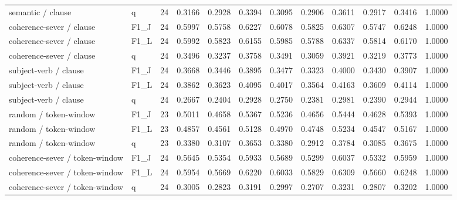\begin{table}[t]
{\begin{tabular}{llllllllllll}
semantic / clause & q & 24 & 0.3166 & 0.2928 & 0.3394 & 0.3095 & 0.2906 & 0.3611 & 0.2917 & 0.3416 & 1.0000 \\
coherence-sever / clause & F1\_J & 24 & 0.5997 & 0.5758 & 0.6227 & 0.6078 & 0.5825 & 0.6307 & 0.5747 & 0.6248 & 1.0000 \\
coherence-sever / clause & F1\_L & 24 & 0.5992 & 0.5823 & 0.6155 & 0.5985 & 0.5788 & 0.6337 & 0.5814 & 0.6170 & 1.0000 \\
coherence-sever / clause & q & 24 & 0.3496 & 0.3237 & 0.3758 & 0.3491 & 0.3059 & 0.3921 & 0.3219 & 0.3773 & 1.0000 \\
subject-verb / clause & F1\_J & 24 & 0.3668 & 0.3446 & 0.3895 & 0.3477 & 0.3323 & 0.4000 & 0.3430 & 0.3907 & 1.0000 \\
subject-verb / clause & F1\_L & 24 & 0.3862 & 0.3623 & 0.4095 & 0.4017 & 0.3564 & 0.4163 & 0.3609 & 0.4114 & 1.0000 \\
subject-verb / clause & q & 24 & 0.2667 & 0.2404 & 0.2928 & 0.2750 & 0.2381 & 0.2981 & 0.2390 & 0.2944 & 1.0000 \\
random / token-window & F1\_J & 23 & 0.5011 & 0.4658 & 0.5367 & 0.5236 & 0.4656 & 0.5444 & 0.4628 & 0.5393 & 1.0000 \\
random / token-window & F1\_L & 23 & 0.4857 & 0.4561 & 0.5128 & 0.4970 & 0.4748 & 0.5234 & 0.4547 & 0.5167 & 1.0000 \\
random / token-window & q & 23 & 0.3380 & 0.3107 & 0.3653 & 0.3380 & 0.2912 & 0.3784 & 0.3085 & 0.3675 & 1.0000 \\
coherence-sever / token-window & F1\_J & 24 & 0.5645 & 0.5354 & 0.5933 & 0.5689 & 0.5299 & 0.6037 & 0.5332 & 0.5959 & 1.0000 \\
coherence-sever / token-window & F1\_L & 24 & 0.5954 & 0.5669 & 0.6220 & 0.6033 & 0.5829 & 0.6309 & 0.5660 & 0.6248 & 1.0000 \\
coherence-sever / token-window & q & 24 & 0.3005 & 0.2823 & 0.3191 & 0.2997 & 0.2707 & 0.3231 & 0.2807 & 0.3202 & 1.0000 \\
\bottomrule
\end{tabular}}
\end{table}
